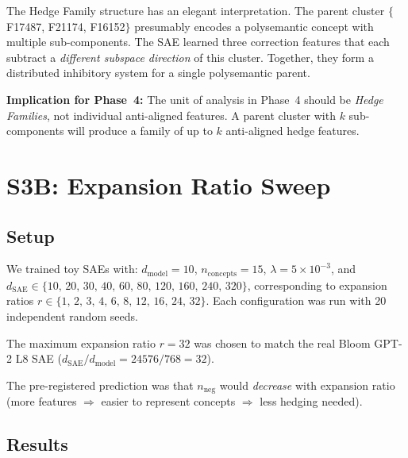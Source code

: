 \documentclass[11pt,a4paper]{article}
\newcommand{\nneg}{n_{\mathrm{neg}}}
\begin{document}
The Hedge Family structure has an elegant interpretation.  The parent cluster
$\{$F17487, F21174, F16152$\}$ presumably encodes a polysemantic concept with multiple
sub-components.  The SAE learned three correction features that each subtract a
\emph{different subspace direction} of this cluster.  Together, they form a
distributed inhibitory system for a single polysemantic parent.

\textbf{Implication for Phase~4:} The unit of analysis in Phase~4 should be
\emph{Hedge Families}, not individual anti-aligned features.  A parent cluster with
$k$ sub-components will produce a family of up to $k$ anti-aligned hedge features.

\section{S3B: Expansion Ratio Sweep}
\label{sec:s3b}

\subsection{Setup}

We trained toy SAEs with:
$d_{\mathrm{model}}{=}10$, $n_{\mathrm{concepts}}{=}15$, $\lambda{=}5\!\times\!10^{-3}$,
and $d_{\mathrm{SAE}} \in \{10,\,20,\,30,\,40,\,60,\,80,\,120,\,160,\,240,\,320\}$,
corresponding to expansion ratios $r \in \{1,\,2,\,3,\,4,\,6,\,8,\,12,\,16,\,24,\,32\}$.
Each configuration was run with 20 independent random seeds.

The maximum expansion ratio $r{=}32$ was chosen to match the real Bloom GPT-2 L8 SAE
($d_{\mathrm{SAE}} / d_{\mathrm{model}} = 24576 / 768 = 32$).

The pre-registered prediction was that $\nneg$ would \emph{decrease} with expansion
ratio (more features $\Rightarrow$ easier to represent concepts $\Rightarrow$ less
hedging needed).

\subsection{Results}
\end{document}
